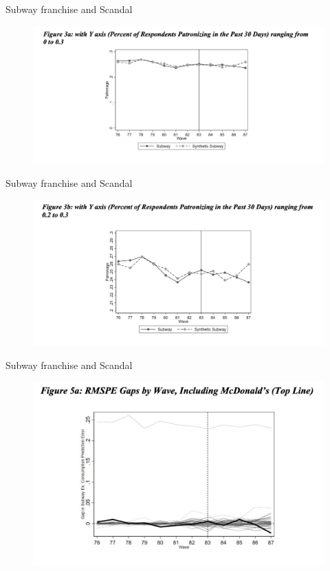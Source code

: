 \documentclass{beamer}
\begin{document}
\begin{frame}{Subway franchise and Scandal}

	\begin{figure}
	\includegraphics[scale=0.3]{./lecture_includes/subway_3.png}
	\end{figure}

\end{frame}


\begin{frame}{Subway franchise and Scandal}

	\begin{figure}
	\includegraphics[scale=0.3]{./lecture_includes/subway_4.png}
	\end{figure}

\end{frame}

\begin{frame}{Subway franchise and Scandal}

	\begin{figure}
	\includegraphics[scale=0.35]{./lecture_includes/subway_5.png}
	\end{figure}

\end{frame}
\end{document}
